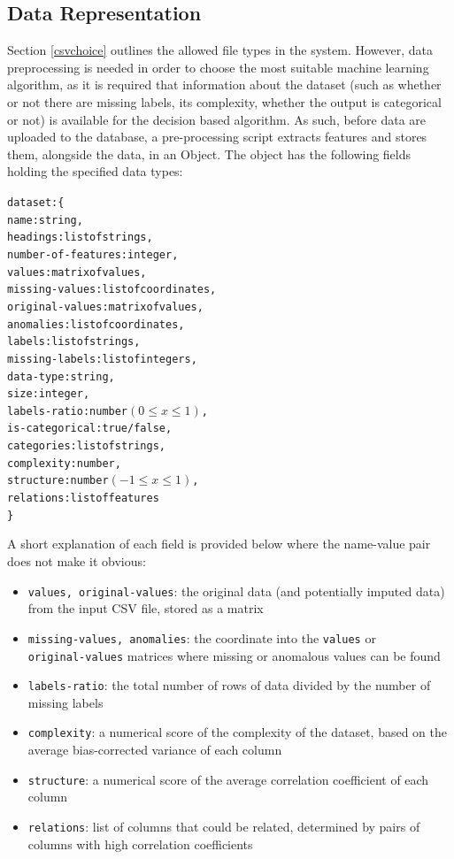 \documentclass[a4paper,titlepage]{article}
\begin{document}
\subsection{Data Representation\label{datarepresentation}}
Section \ref{csvchoice} outlines the allowed file types in the system. 
However, data preprocessing is needed in order to choose the most suitable machine learning algorithm, as it is required that information about the dataset (such as whether or not there are missing labels, its complexity, whether the output is categorical or not) is available for the decision based algorithm. 
As such, before data are uploaded to the database, a pre-processing script extracts features and stores them, alongside the data, in an Object. 
The object has the following fields holding the specified data types:

\begin{alltt}
  dataset: \{
    name: string,
    headings: list of strings,
    number-of-features: integer,
    values: matrix of values,
    missing-values: list of coordinates,
    original-values\footnotemark: matrix of values,
    anomalies: list of coordinates,
    labels: list of strings,
    missing-labels: list of integers,
    data-type: string,
    size: integer,
    labels-ratio: number \((0 \leq x \leq 1)\),
    is-categorical: true / false,
    categories\footnotemark: list of strings, 
    complexity: number,
    structure: number \((-1 \leq x \leq 1)\),
    relations: list of features
  \}
\end{alltt}

A short explanation of each field is provided below where the name-value pair does not make it obvious:
\begin{itemize}
  \item \verb|values, original-values|: the original data (and potentially imputed data) from the input CSV file, stored as a matrix
  \item \verb|missing-values, anomalies|: the coordinate into the \verb|values| or \\\verb|original-values| matrices where missing or anomalous values can be found
  \item \verb|labels-ratio|: the total number of rows of data divided by the number of missing labels
  \item \verb|complexity|: a numerical score of the complexity of the dataset, based on the average bias-corrected variance of each column
  \item \verb|structure|: a numerical score of the average correlation coefficient of each column
  \item \verb|relations|: list of columns that could be related, determined by pairs of columns with high correlation coefficients
\end{itemize}
\end{document}
